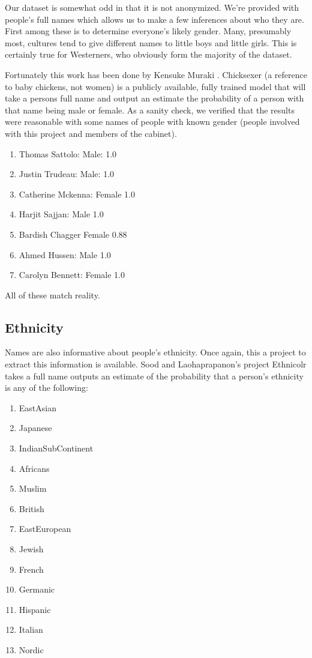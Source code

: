 \documentclass{article}
\begin{document}
Our dataset is somewhat odd in that it is not anonymized. We're provided with
people's full names which allows us to make a few inferences about who they
are.  First among these is to determine everyone's likely gender. Many,
presumably most, cultures tend to give different names to little boys and
little girls. This is certainly true for Westerners, who obviously form the
majority of the dataset.

Fortunately this work has been done by Kensuke Muraki \cite{GenderProj}.
Chicksexer (a reference to baby chickens, not women) is a publicly available,
fully trained model that will take a persons full name and output an estimate
the probability of a person with that name being male or female. As a sanity
check, we verified that the results were reasonable with some names of people
with known gender (people involved with this project and members of the cabinet).

\begin{enumerate}
    \item Thomas Sattolo:  Male: 1.0
    \item Justin Trudeau: Male: 1.0
    \item Catherine Mckenna: Female 1.0
    \item Harjit Sajjan: Male 1.0
    \item Bardish Chagger Female 0.88
    \item Ahmed Hussen: Male 1.0
    \item Carolyn Bennett: Female 1.0
\end{enumerate}

All of these match reality.

\subsection{Ethnicity}

Names are also informative about people's ethnicity. Once again, this a project
to extract this information is available. Sood and Laohaprapanon's project
Ethnicolr \cite{EthnicityProj} takes a full name outputs an estimate of the
probability that a person's ethnicity is any of the following:

\begin{enumerate}
       \item EastAsian
       \item Japanese
       \item IndianSubContinent
       \item Africans
       \item Muslim
       \item British
       \item EastEuropean
       \item Jewish
       \item French
       \item Germanic
       \item Hispanic
       \item Italian
       \item Nordic
\end{enumerate}
\end{document}

